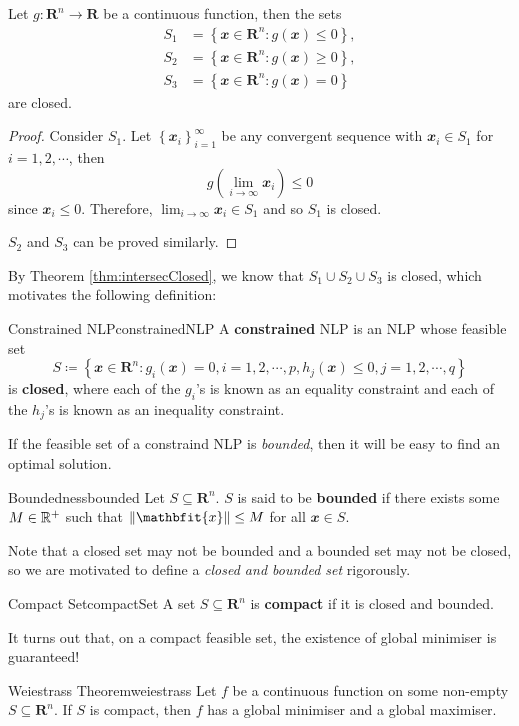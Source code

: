 \documentclass[math, code]{amznotes}
\theoremstyle{remark}
\begin{document}
\begin{probox}{}{}
    Let $g \colon \mathbf{R}^n \to \mathbf{R}$ be a continuous function, then the sets
    \begin{align*}
        S_1 & = \left\{\mathbfit{x} \in \mathbf{R}^n \colon g(\mathbfit{x}) \leq 0\right\}, \\
        S_2 & = \left\{\mathbfit{x} \in \mathbf{R}^n \colon g(\mathbfit{x}) \geq 0\right\}, \\
        S_3 & = \left\{\mathbfit{x} \in \mathbf{R}^n \colon g(\mathbfit{x}) = 0\right\}
    \end{align*}
    are closed.
    \tcblower
    \begin{proof}
        Consider $S_1$. Let $\left\{\mathbfit{x}_i\right\}_{i = 1}^\infty$ be any convergent sequence with $\mathbfit{x}_i \in S_1$ for $i = 1, 2, \cdots$, then
        \begin{equation*}
            g\left(\lim_{i \to \infty}\mathbfit{x}_i\right) \leq 0
        \end{equation*}
        since $\mathbfit{x}_i \leq 0$. Therefore, $\lim_{i \to \infty}\mathbfit{x}_i \in S_1$ and so $S_1$ is closed.

        $S_2$ and $S_3$ can be proved similarly.
    \end{proof}
\end{probox}
By Theorem \ref{thm:intersecClosed}, we know that $S_1 \cup S_2 \cup S_3$ is closed, which motivates the following definition:
\begin{dfnbox}{Constrained NLP}{constrainedNLP}
    A {\color{red} \textbf{constrained}} NLP is an NLP whose feasible set
    \begin{displaymath}
        S \coloneqq \left\{\mathbfit{x} \in \mathbf{R}^n \colon g_i(\mathbfit{x}) = 0, i = 1, 2, \cdots, p, h_j(\mathbfit{x}) \leq 0, j = 1, 2, \cdots, q\right\}
    \end{displaymath}
    is {\color{red} \textbf{closed}}, where each of the $g_i$'s is known as an equality constraint and each of the $h_j$'s is known as an inequality constraint.
\end{dfnbox}
If the feasible set of a constraind NLP is \textit{bounded}, then it will be easy to find an optimal solution.
\begin{dfnbox}{Boundedness}{bounded}
    Let $S \subseteq \mathbf{R}^n$. $S$ is said to be {\color{red} \textbf{bounded}} if there exists some $M \in \mathbb{R}^+$ such that $\norm{\mathbfit{x}} \leq M$ for all $\mathbfit{x} \in S$.
\end{dfnbox}
Note that a closed set may not be bounded and a bounded set may not be closed, so we are motivated to define a \textit{closed and bounded set} rigorously.
\begin{dfnbox}{Compact Set}{compactSet}
    A set $S \subseteq \mathbf{R}^n$ is {\color{red} \textbf{compact}} if it is closed and bounded.
\end{dfnbox}
It turns out that, on a compact feasible set, the existence of global minimiser is guaranteed!
\begin{thmbox}{Weiestrass Theorem}{weiestrass}
    Let $f$ be a continuous function on some non-empty $S \subseteq \mathbf{R}^n$. If $S$ is compact, then $f$ has a global minimiser and a global maximiser.
\end{thmbox}
\end{document}
